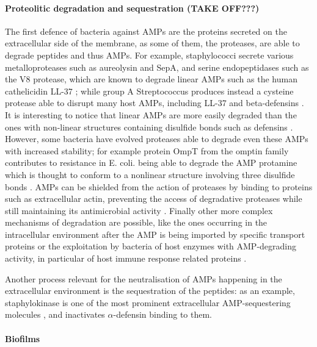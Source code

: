 \paragraph{Proteolitic degradation and sequestration (TAKE OFF???)}
The first defence of bacteria against AMPs are the proteins secreted on the extracellular side of the membrane, as some of them, the proteases, are able to degrade peptides and thus AMPs.
%
For example, staphylococci secrete various metalloproteases such as aureolysin and SepA, and serine endopeptidases such as the V8 protease, which are known to degrade linear AMPs such as the human cathelicidin LL-37 \cite{Sieprawska-Lupa2004,Teufel1993}; while group A Streptococcus produces instead a cysteine protease able to disrupt many host AMPs, including LL-37 and beta-defensins \cite{Schmidtchen2002,Baranska-Rybak2006,Nelson2011,Frick2011}. It is interesting to notice that linear AMPs are more easily degraded than the ones with non-linear structures containing disulfide bonds\cite{Peschel2006} such as defensins \cite{Selsted1989}.
However, some bacteria have evolved proteases able to  degrade even these AMPs with increased stability; for example protein OmpT from the omptin family contributes to resistance in E. coli. being able to degrade the AMP protamine \cite{Stumpe1998}
which is thought to conform to a nonlinear structure involving three disulfide bonds \cite{Biegeleisen2006}.
AMPs can be shielded from the action of proteases by binding to proteins such as extracellular actin, preventing the access of degradative proteases while  still maintaining its antimicrobial activity \cite{Sol2014}.
Finally other more complex mechanisms of degradation are possible, like the ones occurring in the intracellular environment after the AMP is being imported by specific transport proteins \cite{Groisman1992,Parra-Lopez1993,Mason2005} or the exploitation by bacteria of host enzymes with AMP-degrading activity, in particular  of host immune response related proteins \cite{Taggart2003}.

Another process relevant for the neutralisation of AMPs happening in the extracellular environment is the sequestration of the peptides: as an example, staphylokinase is one of the most prominent extracellular AMP-sequestering molecules \cite{Bokarewa2004,Jin2004}, and inactivates $\alpha$-defensin binding to them.


\paragraph{Biofilms}

